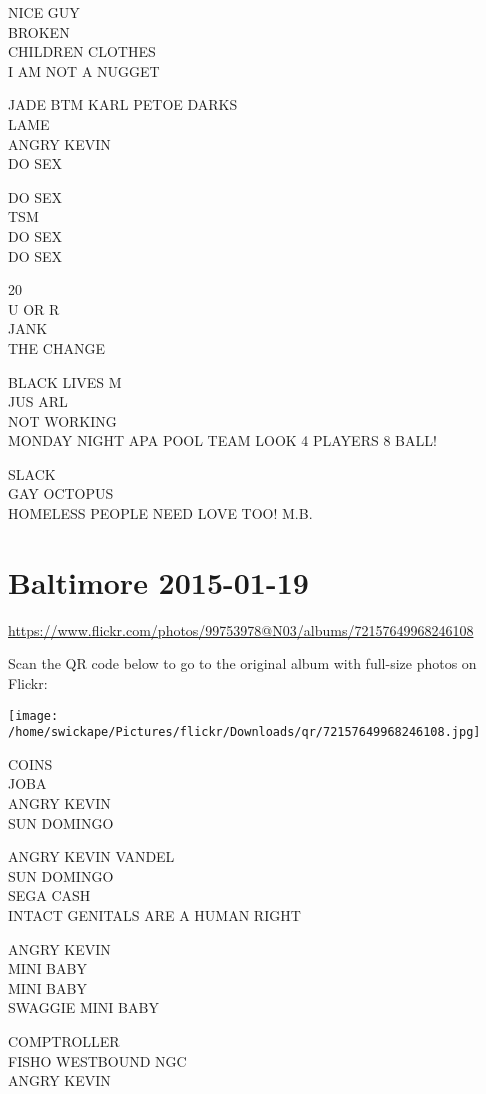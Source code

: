 \documentclass[10pt,letterpaper]{article}
\begin{document}
NICE GUY\\
BROKEN\\
CHILDREN CLOTHES\\
I AM NOT A NUGGET

JADE BTM KARL PETOE DARKS\\
LAME\\
ANGRY KEVIN\\
DO SEX

DO SEX\\
TSM\\
DO SEX\\
DO SEX

20\\
U OR R\\
JANK\\
THE CHANGE

BLACK LIVES M\\
JUS ARL\\
NOT WORKING\\
MONDAY NIGHT APA POOL TEAM LOOK 4 PLAYERS 8 BALL!

SLACK\\
GAY OCTOPUS\\
HOMELESS PEOPLE NEED LOVE TOO!  M.B.


\section*{Baltimore 2015-01-19}

\url{https://www.flickr.com/photos/99753978@N03/albums/72157649968246108}

Scan the QR code below to go to the original album with full-size photos on Flickr:

\texttt{[image: /home/swickape/Pictures/flickr/Downloads/qr/72157649968246108.jpg]}


COINS\\
JOBA\\
ANGRY KEVIN\\
SUN DOMINGO

ANGRY KEVIN VANDEL\\
SUN DOMINGO\\
SEGA CASH\\
INTACT GENITALS ARE A HUMAN RIGHT

ANGRY KEVIN\\
MINI BABY\\
MINI BABY\\
SWAGGIE MINI BABY

COMPTROLLER\\
FISHO WESTBOUND NGC\\
ANGRY KEVIN
\end{document}
